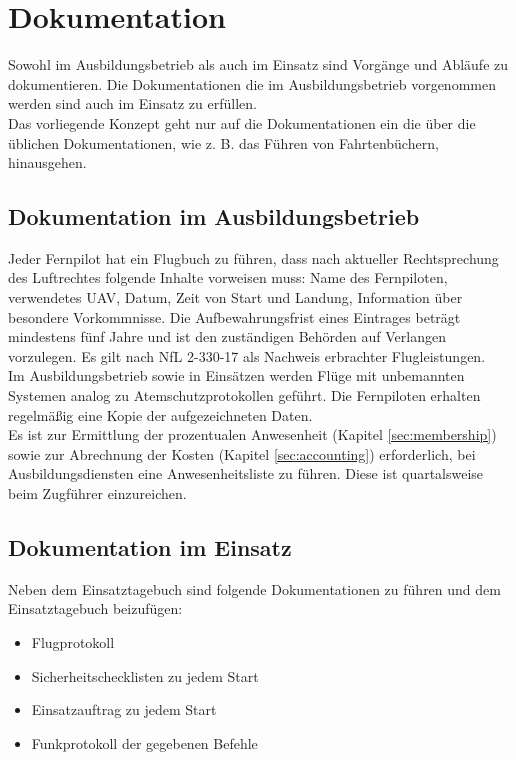 \section{Dokumentation}

Sowohl im Ausbildungsbetrieb als auch im Einsatz sind Vorgänge und Abläufe zu dokumentieren. Die Dokumentationen die im Ausbildungsbetrieb vorgenommen werden sind auch im Einsatz zu erfüllen.\\

\noindent Das vorliegende Konzept geht nur auf die Dokumentationen ein die über die üblichen Dokumentationen, wie z. B. das Führen von Fahrtenbüchern, hinausgehen.

\subsection{Dokumentation im Ausbildungsbetrieb}

Jeder Fernpilot hat ein Flugbuch zu führen, dass nach aktueller Rechtsprechung des Luftrechtes folgende Inhalte vorweisen muss: Name des Fernpiloten, verwendetes UAV, Datum, Zeit von Start und Landung, Information über besondere Vorkommnisse. Die Aufbewahrungsfrist eines Eintrages beträgt mindestens fünf Jahre und ist den zuständigen Behörden auf Verlangen vorzulegen. Es gilt nach NfL 2-330-17 als Nachweis erbrachter Flugleistungen.\\

\noindent Im Ausbildungsbetrieb sowie in Einsätzen werden Flüge mit unbemannten Systemen analog zu Atemschutzprotokollen geführt. Die Fernpiloten erhalten regelmäßig eine Kopie der aufgezeichneten Daten.\\

\noindent Es ist zur Ermittlung der prozentualen Anwesenheit (Kapitel \ref{sec:membership}) sowie zur Abrechnung der Kosten (Kapitel \ref{sec:accounting}) erforderlich, bei Ausbildungsdiensten eine Anwesenheitsliste zu führen. Diese ist quartalsweise beim Zugführer einzureichen.

\subsection{Dokumentation im Einsatz}

Neben dem Einsatztagebuch sind folgende Dokumentationen zu führen und dem Einsatztagebuch beizufügen:

\begin{itemize}
\item Flugprotokoll
\item Sicherheitschecklisten zu jedem Start
\item Einsatzauftrag zu jedem Start
\item Funkprotokoll der gegebenen Befehle
\end{itemize}
